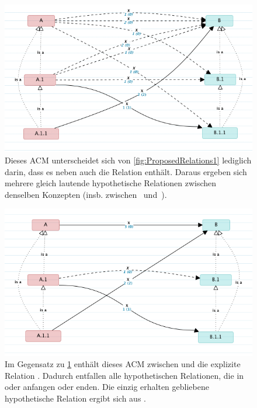 \begin{figure}
  \centering
    \includegraphics[width=1.0\linewidth]{Figures/proposed_relations2.png}
  \caption[APIUA: Modellierung --- Hypothetische Relationen II]{Dieses ACM unterscheidet sich von \ref{fig:ProposedRelations1} lediglich darin, dass es neben  auch die Relation  enthält. Daraus ergeben sich mehrere gleich lautende hypothetische Relationen zwischen denselben Konzepten (insb. zwischen ~und~).}
  \label{fig:ProposedRelations2}
\end{figure}

\begin{figure}
  \centering
    \includegraphics[width=1.0\linewidth]{Figures/proposed_relations3.png}
  \caption[APIUA: Modellierung --- Hypothetische Relationen III]{Im Gegensatz zu \ref{fig:ProposedRelations2} enthält dieses ACM zwischen  und  die explizite Relation . Dadurch entfallen alle hypothetischen Relationen, die in  oder  anfangen oder enden. Die einzig erhalten gebliebene hypothetische Relation ergibt sich aus .}
  \label{fig:ProposedRelations3}
\end{figure}

